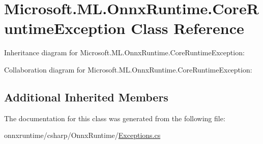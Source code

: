 \hypertarget{classMicrosoft_1_1ML_1_1OnnxRuntime_1_1CoreRuntimeException}{}\section{Microsoft.\+M\+L.\+Onnx\+Runtime.\+Core\+Runtime\+Exception Class Reference}
\label{classMicrosoft_1_1ML_1_1OnnxRuntime_1_1CoreRuntimeException}


Inheritance diagram for Microsoft.\+M\+L.\+Onnx\+Runtime.\+Core\+Runtime\+Exception\+:


Collaboration diagram for Microsoft.\+M\+L.\+Onnx\+Runtime.\+Core\+Runtime\+Exception\+:
\subsection*{Additional Inherited Members}


The documentation for this class was generated from the following file\+:\begin{DoxyCompactItemize}
\item 
onnxruntime/csharp/\+Onnx\+Runtime/\mbox{\hyperlink{Exceptions_8cs}{Exceptions.\+cs}}\end{DoxyCompactItemize}
